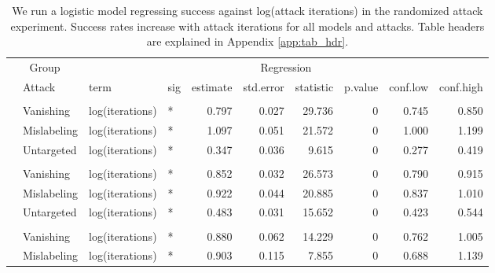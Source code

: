 \begingroup\fontsize{9}{11}\selectfont

\begin{longtable}[t]{llllrrrrrr}
\caption{\label{tab:num_iteration_table}We run a logistic model regressing success against log(attack iterations) in the randomized attack experiment. Success rates increase with attack iterations for all models and attacks. Table headers are explained in Appendix \ref{app:tab_hdr}.}\\
\toprule
\multicolumn{2}{c}{Group} & \multicolumn{8}{c}{Regression} \\
\cmidrule(l{3pt}r{3pt}){1-2} \cmidrule(l{3pt}r{3pt}){3-10}
 & Attack & term & sig & estimate & std.error & statistic & p.value & conf.low & conf.high\\
\midrule
\addlinespace[0.3em]
\multicolumn{10}{l}{\textbf{YOLOv3}}\\
\hspace{1em} & Vanishing & log(iterations) & * & 0.797 & 0.027 & 29.736 & 0 & 0.745 & 0.850\\
\cmidrule{2-10}\nopagebreak
\hspace{1em} & Mislabeling & log(iterations) & * & 1.097 & 0.051 & 21.572 & 0 & 1.000 & 1.199\\
\cmidrule{2-10}\nopagebreak
\hspace{1em} & Untargeted & log(iterations) & * & 0.347 & 0.036 & 9.615 & 0 & 0.277 & 0.419\\
\cmidrule{1-10}\pagebreak[0]
\addlinespace[0.3em]
\multicolumn{10}{l}{\textbf{SSD}}\\
\hspace{1em} & Vanishing & log(iterations) & * & 0.852 & 0.032 & 26.573 & 0 & 0.790 & 0.915\\
\cmidrule{2-10}\nopagebreak
\hspace{1em} & Mislabeling & log(iterations) & * & 0.922 & 0.044 & 20.885 & 0 & 0.837 & 1.010\\
\cmidrule{2-10}\nopagebreak
\hspace{1em} & Untargeted & log(iterations) & * & 0.483 & 0.031 & 15.652 & 0 & 0.423 & 0.544\\
\cmidrule{1-10}\pagebreak[0]
\addlinespace[0.3em]
\multicolumn{10}{l}{\textbf{RetinaNet}}\\
\hspace{1em} & Vanishing & log(iterations) & * & 0.880 & 0.062 & 14.229 & 0 & 0.762 & 1.005\\
\cmidrule{2-10}\nopagebreak
\hspace{1em} & Mislabeling & log(iterations) & * & 0.903 & 0.115 & 7.855 & 0 & 0.688 & 1.139\\

\end{longtable}
